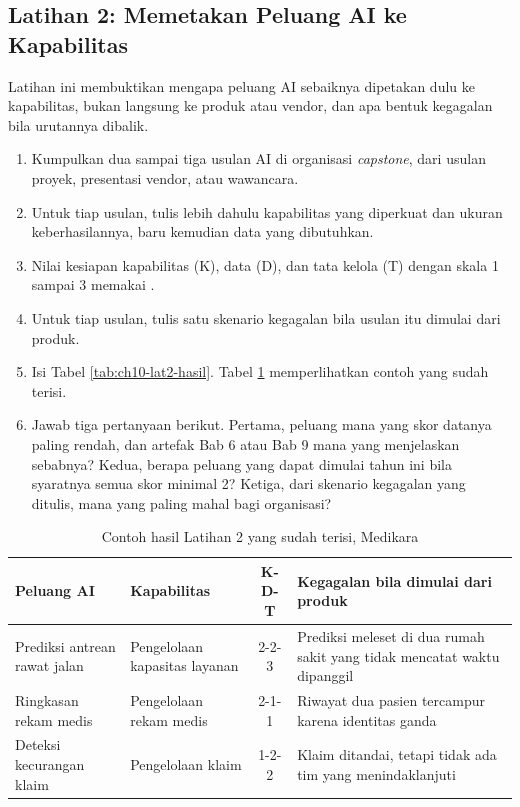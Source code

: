 \subsection*{Latihan 2: Memetakan Peluang AI ke Kapabilitas}

Latihan ini membuktikan mengapa peluang AI sebaiknya dipetakan dulu ke
kapabilitas, bukan langsung ke produk atau vendor, dan apa bentuk kegagalan
bila urutannya dibalik.

\begin{enumerate}
  \item Kumpulkan dua sampai tiga usulan AI di organisasi \textit{capstone},
        dari usulan proyek, presentasi vendor, atau wawancara.
  \item Untuk tiap usulan, tulis lebih dahulu kapabilitas yang diperkuat dan
        ukuran keberhasilannya, baru kemudian data yang dibutuhkan.
  \item Nilai kesiapan kapabilitas (K), data (D), dan tata kelola (T) dengan
        skala 1 sampai 3 memakai
        .
  \item Untuk tiap usulan, tulis satu skenario kegagalan bila usulan itu
        dimulai dari produk.
  \item Isi Tabel \ref{tab:ch10-lat2-hasil}. Tabel \ref{tab:ch10-lat2-contoh}
        memperlihatkan contoh yang sudah terisi.
  \item Jawab tiga pertanyaan berikut. Pertama, peluang mana yang skor
        datanya paling rendah, dan artefak Bab 6 atau Bab 9 mana yang
        menjelaskan sebabnya? Kedua, berapa peluang yang dapat dimulai tahun
        ini bila syaratnya semua skor minimal 2? Ketiga, dari skenario
        kegagalan yang ditulis, mana yang paling mahal bagi organisasi?
\end{enumerate}

\begin{table}[!htb]
  \centering
  \caption{Contoh hasil Latihan 2 yang sudah terisi, Medikara}
  \label{tab:ch10-lat2-contoh}
  \small
  \begin{tabularx}{\textwidth}{XXcX}
    \hline
    \textbf{Peluang AI} & \textbf{Kapabilitas} & \textbf{K-D-T} & \textbf{Kegagalan bila dimulai dari produk} \\
    \hline
    Prediksi antrean rawat jalan & Pengelolaan kapasitas layanan & 2-2-3 & Prediksi meleset di dua rumah sakit yang tidak mencatat waktu dipanggil \\
    \hline
    Ringkasan rekam medis & Pengelolaan rekam medis & 2-1-1 & Riwayat dua pasien tercampur karena identitas ganda \\
    \hline
    Deteksi kecurangan klaim & Pengelolaan klaim & 1-2-2 & Klaim ditandai, tetapi tidak ada tim yang menindaklanjuti \\
    \hline
  \end{tabularx}
\end{table}

